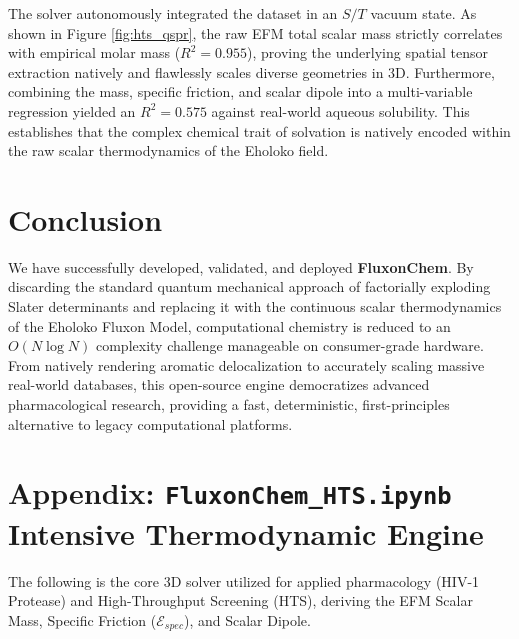 \documentclass[11pt, twoside]{article}
\begin{document}
The solver autonomously integrated the dataset in an $S/T$ vacuum state. As shown in Figure \ref{fig:hts_qspr}, the raw EFM total scalar mass strictly correlates with empirical molar mass ($R^2 = 0.955$), proving the underlying spatial tensor extraction natively and flawlessly scales diverse geometries in 3D. Furthermore, combining the mass, specific friction, and scalar dipole into a multi-variable regression yielded an $R^2 = 0.575$ against real-world aqueous solubility. This establishes that the complex chemical trait of solvation is natively encoded within the raw scalar thermodynamics of the Eholoko field.

\section{Conclusion}

We have successfully developed, validated, and deployed \textbf{FluxonChem}. By discarding the standard quantum mechanical approach of factorially exploding Slater determinants and replacing it with the continuous scalar thermodynamics of the Eholoko Fluxon Model, computational chemistry is reduced to an $O(N \log N)$ complexity challenge manageable on consumer-grade hardware. From natively rendering aromatic delocalization to accurately scaling massive real-world databases, this open-source engine democratizes advanced pharmacological research, providing a fast, deterministic, first-principles alternative to legacy computational platforms.

\newpage
\appendix
\section{Appendix: \texttt{FluxonChem\_HTS.ipynb} Intensive Thermodynamic Engine}

The following is the core 3D solver utilized for applied pharmacology (HIV-1 Protease) and High-Throughput Screening (HTS), deriving the EFM Scalar Mass, Specific Friction ($\mathcal{E}_{spec}$), and Scalar Dipole.
\end{document}
